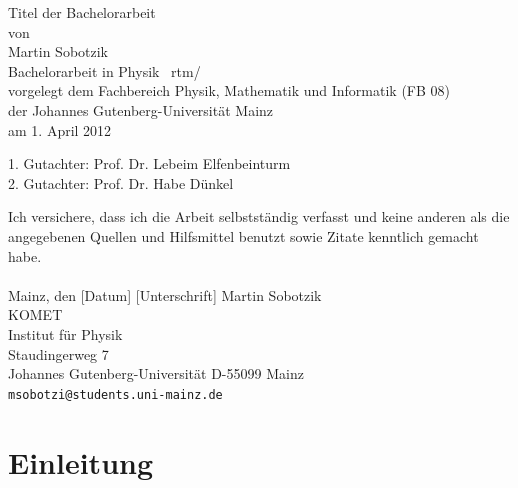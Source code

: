 \documentclass[a4paper,11pt,oneside,final,german,openbib,pdftex]{scrbook}
\begin{document}

\begin{titlepage}
  \vspace*{6mm}
  \begin{center}
     {\afont Titel der Bachelorarbeit}
     \\[3.5cm]
     {\large von}
     \\[3.5cm]
     {\dfont Martin Sobotzik}
     \\[2cm]
     {\large Bachelorarbeit in Physik \ rtm/\\
        vorgelegt dem Fachbereich Physik, Mathematik und Informatik (FB 08) \/\\
        der Johannes Gutenberg-Universit\"at Mainz \/\\
        am 1. April 2012}
   \end{center}
   \vfill
   1. Gutachter: Prof. Dr. Lebeim Elfenbeinturm\\	
   2. Gutachter: Prof. Dr. Habe D\"unkel \\
   \vfill
\end{titlepage}

\thispagestyle{empty}
Ich versichere, dass ich die Arbeit selbstst\"andig verfasst und keine 
anderen als die angegebenen Quellen und Hilfsmittel benutzt sowie 
Zitate kenntlich gemacht habe.
\\
\\[3.5cm] 
Mainz, den [Datum] [Unterschrift]
\vfill
\noindent 
Martin Sobotzik\\
KOMET\\
Institut f\"ur Physik\\
Staudingerweg 7\\
Johannes Gutenberg-Universit\"at
D-55099 Mainz\\
{\tt msobotzi@students.uni-mainz.de}

\renewcommand\contentsname{Inhaltsverzeichnis}
\renewcommand\figurename{Abbildung}
\renewcommand\tablename{Tabelle}
\tableofcontents
\clearpage

\mainmatter
\sloppy

\chapter{Einleitung}
\end{document}
